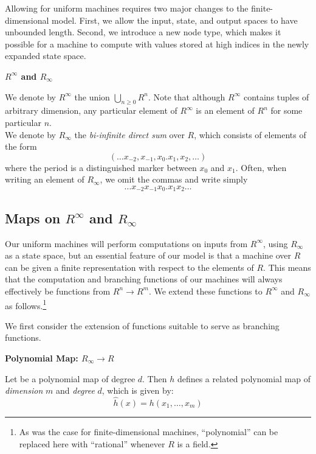  Allowing for uniform machines requires two major changes to the
  finite-dimensional model.  First, we allow the input, state, and
  output spaces to have unbounded length.  Second, we introduce a new
  node type, which makes it possible for a machine to compute with
  values stored at high indices in the newly expanded state space.\\
  
  \begin{definition}{\textbf{$R^\infty$ and $R_\infty$}}

    We denote by $R^\infty$ the union $\bigcup_{n \geq 0} R^n$. Note
    that although $R^\infty$ contains tuples of arbitrary dimension,
    any particular element of $R^\infty$ is an element of $R^n$ for
    some particular $n$.\\

    We denote by $R_\infty$ the \emph{bi-infinite direct sum} over
    $R$, which consists of elements of the form $$(\ldots x_{-2},
    x_{-1}, x_0.x_1, x_2, \ldots)$$ where the period is a
    distinguished marker between $x_0$ and $x_1$.  Often, when writing
    an element of $R_\infty$, we omit the commas and write simply
    $$\ldots x_{-2}x_{-1}x_0.x_1x_2 \ldots$$
  \end{definition}

  \subsection{Maps on $R^\infty$ and $R_\infty$}
    
  Our uniform machines will perform computations on inputs from
  $R^\infty$, using $R_\infty$ as a state space, but an essential
  feature of our model is that a machine over $R$ can be given a
  finite representation with respect to the elements of $R$.  This
  means that the computation and branching functions of our machines
  will always effectively be functions from $R^n \rightarrow R^m$.  We
  extend these functions to $R^\infty$ and $R_\infty$ as
  follows.\footnote{As was the case for finite-dimensional machines,
    ``polynomial'' can be replaced here with ``rational'' whenever $R$
    is a field.}

  We first consider the extension of functions suitable to serve as
  branching functions.  

  \begin{definition}{\textbf{Polynomial Map: $R_\infty \rightarrow R$}}
    
    Let  be a polynomial map of degree $d$.  Then
    $h$ defines a related polynomial map
     of \emph{dimension} $m$ and
    \emph{degree} $d$, which is given by:
    $$\widehat{h}(x) = h(x_1, \ldots, x_m)$$
  \end{definition}

